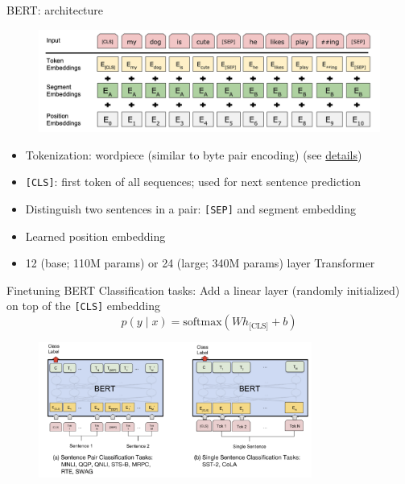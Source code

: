 \documentclass[usenames,dvipsnames,notes,11pt,aspectratio=169,hyperref={colorlinks=true, linkcolor=blue}]{beamer}
\begin{document}
\begin{frame}
    {BERT: architecture}
    \begin{figure}
            \includegraphics[width=.9\textwidth]{figures/bert}
    \end{figure}
    \vspace{-1em}
    \begin{itemize}[<+->]
        \item Tokenization: wordpiece (similar to byte pair encoding) (see \href{https://huggingface.co/learn/nlp-course/chapter6/6?fw=pt}{details})
        \item \texttt{[CLS]}: first token of all sequences; used for next sentence prediction
        \item Distinguish two sentences in a pair: \texttt{[SEP]} and segment embedding
        \item Learned position embedding
        \item 12 (base; 110M params) or 24 (large; 340M params) layer Transformer
    \end{itemize}
\end{frame}

\begin{frame}
    {Finetuning BERT}
        Classification tasks:
            Add a linear layer (randomly initialized) on top of the \texttt{[CLS]} embedding
            $$
            p(y\mid x) = \mathrm{softmax}(Wh_{\text{[CLS]}}+b)
            $$
            \begin{figure}
                \includegraphics[width=0.8\textwidth]{figures/bert-classification}
            \end{figure}
\end{frame}
\end{document}
